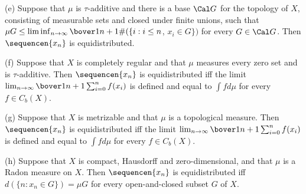 (e) Suppose that $\mu$ is $\tau$-additive and there is a base $\Cal G$
for the topology of $X$, consisting of measurable sets and closed
under finite unions, such that
$\mu G\le\liminf_{n\to\infty}\bover1{n+1}\#(\{i:i\le n$, $x_i\in G\})$
for every $G\in\Cal G$.   Then $\sequencen{x_n}$ is equidistributed.

(f) Suppose that $X$ is completely regular and that $\mu$ measures
every zero set and is $\tau$-additive.
Then $\sequencen{x_n}$ is equidistributed iff the limit
$\lim_{n\to\infty}\bover1{n+1}\sum_{i=0}^nf(x_i)$ is defined and equal to
$\int fd\mu$ for every $f\in C_b(X)$.

(g) Suppose that $X$ is metrizable and that $\mu$ is a topological
measure.   Then $\sequencen{x_n}$ is equidistributed iff the limit
$\lim_{n\to\infty}\bover1{n+1}\sum_{i=0}^nf(x_i)$ is defined and equal to
$\int fd\mu$ for every $f\in C_b(X)$.

(h) Suppose that $X$ is compact, Hausdorff and zero-dimensional, and
that $\mu$ is a Radon measure on $X$.   Then $\sequencen{x_n}$ is
equidistributed iff
$d(\{n:x_n\in G\})=\mu G$ for every open-and-closed subset $G$ of $X$.

